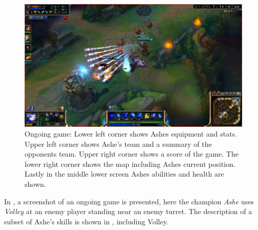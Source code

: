 \begin{figure}[!htb]
  \centering
    \includegraphics[width=1\textwidth]{img/lolgame.png}
  \caption{Ongoing game: Lower left corner shows Ashes equipment and stats. Upper left corner shows Ashe's team and a summary of the opponents team. Upper right corner shows a score of the game. The lower right corner shows the map including Ashes current position. Lastly in the middle lower screen Ashes abilities and health are shown.}\label{fig:lolgame}
\end{figure}

In , a screenshot of an ongoing game is presented, here the champion \emph{Ashe} uses \emph{Volley} at an enemy player standing near an enemy turret. The description of a subset of Ashe's skills is shown in , including Volley.

